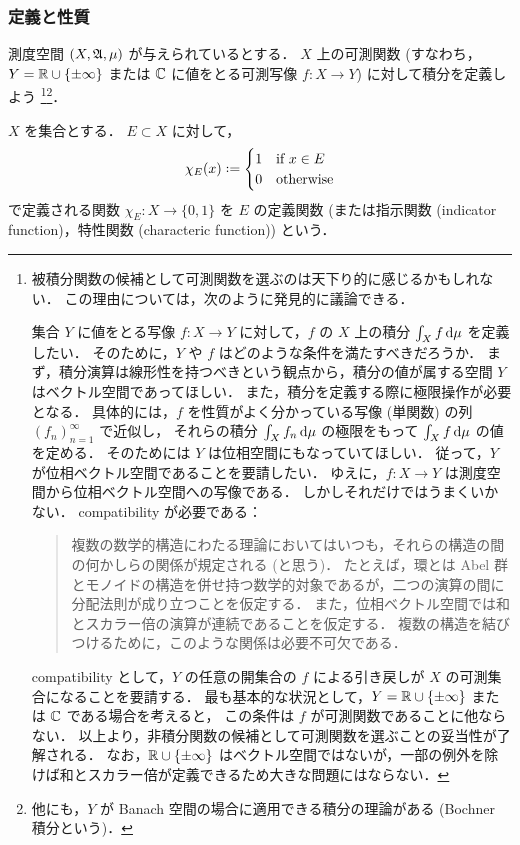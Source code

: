 \subsubsection{定義と性質}

測度空間 $(X,\mathfrak{A},\mu)$ が与えられているとする．
$X$ 上の可測関数 (すなわち，$Y=\mathbb{R}\cup\{\pm\infty\}$ または $\mathbb{C}$ に値をとる可測写像 $f:X\to Y$) に対して積分を定義しよう
\footnote{
    被積分関数の候補として可測関数を選ぶのは天下り的に感じるかもしれない．
    この理由については，次のように発見的に議論できる．

    集合 $Y$ に値をとる写像 $f:X\to Y$ に対して，$f$ の $X$ 上の積分 $\int_Xf\,\mathrm{d}\mu$ を定義したい．
    そのために，$Y$ や $f$ はどのような条件を満たすべきだろうか．
    まず，積分演算は線形性を持つべきという観点から，積分の値が属する空間 $Y$ はベクトル空間であってほしい．
    また，積分を定義する際に極限操作が必要となる．
    具体的には，$f$ を性質がよく分かっている写像 (単関数) の列 $(f_n)_{n=1}^\infty$ で近似し，
    それらの積分 $\int_X f_n\,\mathrm{d}\mu$ の極限をもって $\int_Xf\,\mathrm{d}\mu$ の値を定める．
    そのためには $Y$ は位相空間にもなっていてほしい．
    従って，$Y$ が位相ベクトル空間であることを要請したい．
    ゆえに，$f:X\to Y$ は測度空間から位相ベクトル空間への写像である．
    しかしそれだけではうまくいかない．
    compatibility が必要である：
    \begin{quote}
        複数の数学的構造にわたる理論においてはいつも，それらの構造の間の何かしらの関係が規定される (と思う)．
        たとえば，環とは Abel 群とモノイドの構造を併せ持つ数学的対象であるが，二つの演算の間に分配法則が成り立つことを仮定する．
        また，位相ベクトル空間では和とスカラー倍の演算が連続であることを仮定する．
        複数の構造を結びつけるために，このような関係は必要不可欠である．
    \end{quote}
    compatibility として，$Y$ の任意の開集合の $f$ による引き戻しが $X$ の可測集合になることを要請する．
    最も基本的な状況として，$Y=\mathbb{R}\cup\{\pm\infty\}$ または $\mathbb{C}$ である場合を考えると，
    この条件は $f$ が可測関数であることに他ならない．
    以上より，非積分関数の候補として可測関数を選ぶことの妥当性が了解される．
    なお，$\mathbb{R}\cup\{\pm\infty\}$ はベクトル空間ではないが，一部の例外を除けば和とスカラー倍が定義できるため大きな問題にはならない．
}\footnote{
    他にも，$Y$ が Banach 空間の場合に適用できる積分の理論がある (Bochner 積分という)．
}．

\begin{definition}
    $X$ を集合とする．
    $E\subset X$ に対して，
    \begin{align*}
        \chi_E(x)\defeq\begin{cases}
            1&\text{if $x\in E$}\\
            0&\text{otherwise}
        \end{cases}
    \end{align*}
    で定義される関数 $\chi_E:X\to\{0,1\}$ を $E$ の定義関数
    (または指示関数 (indicator function)，特性関数 (characteric function)) という．
\end{definition}

